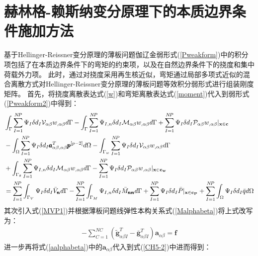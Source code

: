 \section{赫林格-赖斯纳变分原理下的本质边界条件施加方法}
基于Hellinger-Reissner变分原理的薄板问题伽辽金弱形式(\ref{Pweakform})中的积分项包括了在本质边界条件下的弯矩的约束项，以及在自然边界条件下的挠度和集中荷载外力项。
此时，通过对挠度采用再生核近似，弯矩通过局部多项式近似的混合离散方式对Hellinger-Reissner变分原理的薄板问题等效积分弱形式进行组装刚度矩阵。
首先，将挠度离散表达式(\ref{w})和弯矩离散表达式(\ref{moment})代入到弱形式(\ref{Pweakform2})中得到：
\begin{equation}\label{CH5-1}
\begin{split}
    &\int_{\Gamma}\sum_{I=1}^{N\!P}\Psi_I\delta{d_I}\mathcal{V}_{\alpha\beta}w_{,\alpha\beta}d\Gamma-\int_{\Gamma}\sum_{I=1}^{N\!P}\Psi_{I,n}\delta{d_I}\mathcal{M}_{\alpha\beta}w_{,\alpha\beta}d\Gamma+\sum_{I=1}^{N\!P}\Psi_I\delta{d_I}\mathcal{P}_{\alpha\beta}w_{,\alpha\beta}\vert_{\bf{x}\in c}\\
    &-\int_{\Omega}\sum_{I=1}^{N\!P}\Psi_I\delta{d_I}\pmb{a}^T_{\alpha\beta,\alpha\beta}\pmb{p}^{[p-2]}d\Omega-\int_{\Gamma_w}\sum_{I=1}^{N\!P}\Psi_I\delta{d_I}\mathcal{V}_{\alpha\beta}w_{,\alpha\beta}d\Gamma\\
    &+\int_{\Gamma_{\theta}}\sum_{I=1}^{N\!P}\Psi_{I,n}\delta{d_I}\mathcal{M}_{\alpha\beta}w_{,\alpha\beta}d\Gamma
    -\sum_{I=1}^{N\!P}\Psi_I\delta{d_I}\mathcal{P}_{\alpha\beta}w_{,\alpha\beta}\vert_{\bf{x}\in c_w}\\
    &=\sum_{I=1}^{N\!P}\int_{\Gamma_V}\Psi_I\delta{d_I}\bar{V}_{\pmb n}d\Gamma-\sum_{I=1}^{N\!P}\int_{\Gamma_M}\Psi_{I,n}\delta{d_I}\bar{M}_{\pmb{nn}}d\Gamma
    +\sum_{I=1}^{N\!P}\Psi_I\delta{d_I}\bar{P}\vert_{\bf{x}\in{c_P}}+\sum_{I=1}^{N\!P}\int_{\Omega}\Psi_I\delta{d_I}\bar{q}d\Omega
\end{split}
\end{equation}
其次引入式(\ref{MVP1})并根据薄板问题线弹性本构关系式(\ref{Malphabeta})将上式改写为：
\begin{equation}\label{CH5-2}
\begin{split}
  -\sum_{C=1}^{N\!C}(\tilde{\pmb g}_{\alpha\beta I}^T-\bar{\pmb g}_{\alpha\beta I}^T)\pmb a_{\alpha\beta}=\pmb{f}
\end{split}
\end{equation}
进一步再将式(\ref{aalphabeta})中的$\pmb{a}_{\alpha\beta}$代入到式(\ref{CH5-2})中进而得到：
